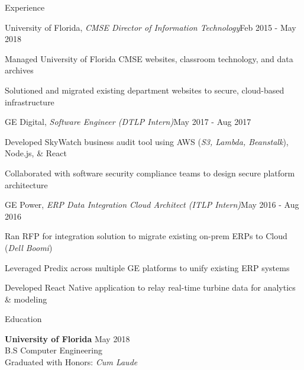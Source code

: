 \documentclass{resume} %
\begin{document}
\begin{rSection}{Experience}
\begin{rSubsection}{University of Florida, \textit{CMSE Director of Information Technology}}{Feb 2015 - May 2018}{}{}
\setlength{\itemindent}{.25in}
\item Managed University of Florida CMSE websites, classroom technology, and data archives
\item Solutioned and migrated existing department websites to secure, cloud-based infrastructure
\end{rSubsection}

\begin{rSubsection}{GE Digital, \textit{Software Engineer (DTLP Intern)}}{May 2017 - Aug 2017}{}{}
\setlength{\itemindent}{.25in}
\item Developed SkyWatch business audit tool using AWS (\textit{S3, Lambda, Beanstalk}), Node.js, \& React
\item Collaborated with software security compliance teams to design secure platform architecture
\end{rSubsection}

\begin{rSubsection}{GE Power, \textit{ERP Data Integration Cloud Architect (ITLP Intern)}}{May 2016 - Aug 2016}{}{}
\setlength{\itemindent}{.25in}
\item Ran RFP for integration solution to migrate existing on-prem ERPs to Cloud (\textit{Dell Boomi})
\item Leveraged Predix across multiple GE platforms to unify existing ERP systems
\item Developed React Native application to relay real-time turbine data for analytics \& modeling
\end{rSubsection}

\end{rSection}

\begin{rSection}{Education}

    {\bf University of Florida} \hfill {May 2018} 
    \\ B.S Computer Engineering
    \\ Graduated with Honors: \textit{Cum Laude}
    
    \end{rSection}
\end{document}
